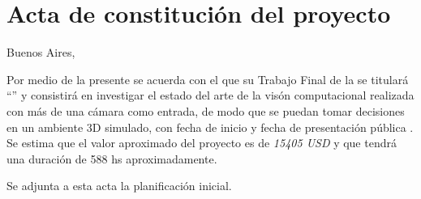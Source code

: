 \documentclass[
11pt, %
]{charter}
\begin{document}
\pagebreak



\section*{Acta de constitución del proyecto}
\label{sec:acta}

\begin{flushright}
Buenos Aires, \fechaInicioName
\end{flushright}

\vspace{2cm}

Por medio de la presente se acuerda con el \authorname\hspace{1px} que su Trabajo Final de la \degreename\hspace{1px} se titulará ``\ttitle'' y  consistirá en investigar el estado del arte de la visón computacional realizada con más de una cámara como entrada, de modo que se puedan tomar decisiones en un ambiente 3D simulado, con fecha de inicio \fechaInicioName\hspace{1px} y fecha de presentación pública \fechaFinalName. Se estima que el valor aproximado del proyecto es de \emph{15405 USD} y que tendrá una duración de 588 hs aproximadamente.

Se adjunta a esta acta la planificación inicial.

\vfill
\end{document}
